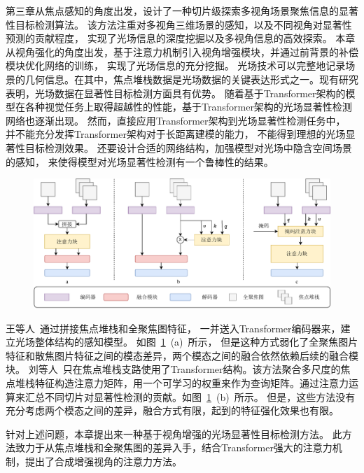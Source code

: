 \label{chap:part4}
%
%
%
%
第三章从焦点感知的角度出发，设计了一种切片级探索多视角场景聚焦信息的显著性目标检测算法。
该方法注重对多视角三维场景的感知，以及不同视角对显著性预测的贡献程度，
实现了光场信息的深度挖掘以及多视角信息的高效探索。
%
%
本章从视角强化的角度出发，基于注意力机制引入视角增强模块，并通过前背景的补偿模块优化网络的训练，
实现了光场信息的充分挖掘。
%
%
%
%
%
%
%
%
光场技术可以完整地记录场景的几何信息。在其中，焦点堆栈数据是光场数据的关键表达形式之一。现有研究表明，光场数据在显著性目标检测方面具有优势。
随着基于Transformer架构的模型在各种视觉任务上取得超越性的性能，基于Transformer架构的光场显著性检测网络也逐渐出现\cite{wang2023tenet,liu2023lftransnet}。
然而，直接应用Transformer架构到光场显著性检测任务中，
并不能充分发挥Transformer架构对于长距离建模的能力，
不能得到理想的光场显著性目标检测效果。
还要设计合适的网络结构，加强模型对光场中隐含空间场景的感知，
来使得模型对光场显著性检测有一个鲁棒性的结果。
%
%
%
%
\par
\begin{figure}[!ht]
	\centering
	\includegraphics[width=0.95\linewidth]{figures/chapter4/task2_ins.drawio}
	\label{cpt4_fig1:task2_ins}
\end{figure}
%
%
%
%
王等人~\cite{wang2023tenet}通过拼接焦点堆栈和全聚焦图特征，
一并送入Transformer编码器来，建立光场整体结构的感知模型。
如图~\ref{cpt4_fig1:task2_ins}~(a)~所示，
但是这种方式弱化了全聚焦图片特征和散焦图片特征之间的模态差异，两个模态之间的融合依然依赖后续的融合模块。
刘等人~\cite{liu2023lftransnet}只在焦点堆栈支路使用了Transformer结构。该方法聚合多尺度的焦点堆栈特征构造注意力矩阵，用一个可学习的权重来作为查询矩阵。通过注意力运算来汇总不同切片对显著性检测的贡献。如图~\ref{cpt4_fig1:task2_ins}~(b)~所示。
%
%
但是，这些方法没有充分考虑两个模态之间的差异，融合方式有限，起到的特征强化效果也有限。


针对上述问题，本章提出来一种基于视角增强的光场显著性目标检测方法。
此方法致力于从焦点堆栈和全聚焦图的差异入手，结合Transformer强大的注意力机制，提出了合成增强视角的注意力方法。


